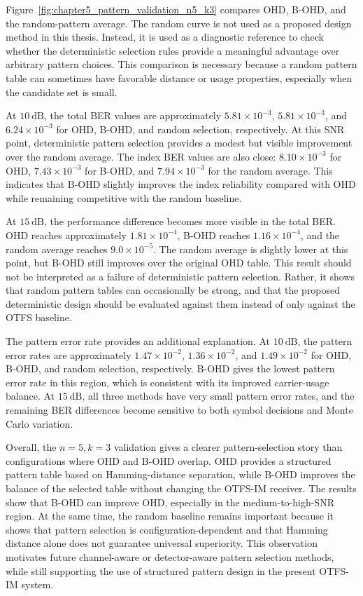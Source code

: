 Figure~\ref{fig:chapter5_pattern_validation_n5_k3} compares OHD, B-OHD, and the random-pattern average. The random curve is not used as a proposed design method in this thesis. Instead, it is used as a diagnostic reference to check whether the deterministic selection rules provide a meaningful advantage over arbitrary pattern choices. This comparison is necessary because a random pattern table can sometimes have favorable distance or usage properties, especially when the candidate set is small.

At \(10~\mathrm{dB}\), the total BER values are approximately \(5.81\times10^{-3}\), \(5.81\times10^{-3}\), and \(6.24\times10^{-3}\) for OHD, B-OHD, and random selection, respectively. At this SNR point, deterministic pattern selection provides a modest but visible improvement over the random average. The index BER values are also close: \(8.10\times10^{-3}\) for OHD, \(7.43\times10^{-3}\) for B-OHD, and \(7.94\times10^{-3}\) for the random average. This indicates that B-OHD slightly improves the index reliability compared with OHD while remaining competitive with the random baseline.

At \(15~\mathrm{dB}\), the performance difference becomes more visible in the total BER. OHD reaches approximately \(1.81\times10^{-4}\), B-OHD reaches \(1.16\times10^{-4}\), and the random average reaches \(9.0\times10^{-5}\). The random average is slightly lower at this point, but B-OHD still improves over the original OHD table. This result should not be interpreted as a failure of deterministic pattern selection. Rather, it shows that random pattern tables can occasionally be strong, and that the proposed deterministic design should be evaluated against them instead of only against the OTFS baseline.

The pattern error rate provides an additional explanation. At \(10~\mathrm{dB}\), the pattern error rates are approximately \(1.47\times10^{-2}\), \(1.36\times10^{-2}\), and \(1.49\times10^{-2}\) for OHD, B-OHD, and random selection, respectively. B-OHD gives the lowest pattern error rate in this region, which is consistent with its improved carrier-usage balance. At \(15~\mathrm{dB}\), all three methods have very small pattern error rates, and the remaining BER differences become sensitive to both symbol decisions and Monte Carlo variation.

Overall, the \(n=5,k=3\) validation gives a clearer pattern-selection story than configurations where OHD and B-OHD overlap. OHD provides a structured pattern table based on Hamming-distance separation, while B-OHD improves the balance of the selected table without changing the OTFS-IM receiver. The results show that B-OHD can improve OHD, especially in the medium-to-high-SNR region. At the same time, the random baseline remains important because it shows that pattern selection is configuration-dependent and that Hamming distance alone does not guarantee universal superiority. This observation motivates future channel-aware or detector-aware pattern selection methods, while still supporting the use of structured pattern design in the present OTFS-IM system.

